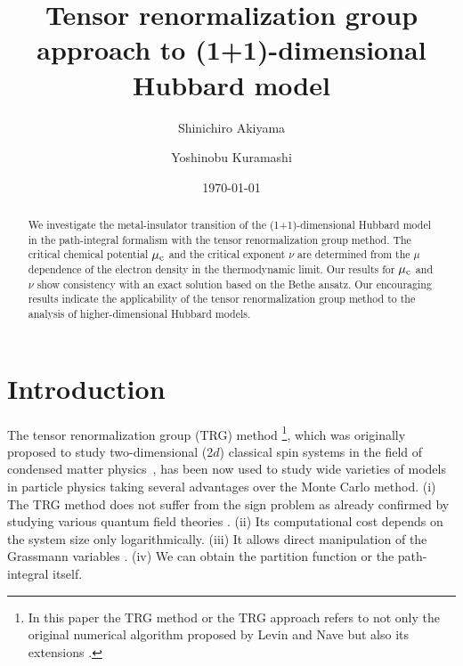 \documentclass[nofootinbib,prd,aps,superscriptaddress,preprintnumbers,twocolumn,showpacs]{revtex4-1}
\begin{document}
\title{Tensor renormalization group approach to (1+1)-dimensional Hubbard model}

  \author{Shinichiro Akiyama}

  \author{Yoshinobu Kuramashi}
    
\begin{abstract}
We investigate the metal-insulator transition of the (1+1)-dimensional Hubbard model in the path-integral formalism with the tensor renormalization group method. The critical chemical potential $\mu_{\rm c}$ and the critical exponent $\nu$ are determined from the $\mu$ dependence of the electron density in the thermodynamic limit. Our results for $\mu_{\rm c}$ and $\nu$ show consistency with an exact solution based on the Bethe ansatz. Our encouraging results indicate the applicability of the tensor renormalization group method to the analysis of higher-dimensional Hubbard models.
\end{abstract}
\date{\today}


\maketitle

\section{Introduction}
\label{sec:intro}

The tensor renormalization group (TRG) method \footnote{In this paper the TRG method or the TRG approach refers to not only the original numerical algorithm proposed by Levin and Nave \cite{Levin:2006jai} but also its extensions \cite{PhysRevB.86.045139,Shimizu:2014uva,Sakai:2017jwp,Adachi:2019paf,Kadoh:2019kqk,Akiyama:2020soe}.}, which was originally proposed to study two-dimensional (2$d$) classical spin systems in the field of condensed matter physics~\cite{Levin:2006jai}, has been now used to study wide varieties of models in particle physics taking several advantages over the Monte Carlo method. (i) The TRG method does not suffer from the sign problem as already confirmed by studying various quantum field theories \cite{Shimizu:2014uva,Shimizu:2014fsa,Shimizu:2017onf,Takeda:2014vwa,Kadoh:2018hqq,Kadoh:2019ube,Kuramashi:2019cgs,Akiyama:2020ntf,Akiyama:2020soe}. (ii) Its computational cost depends on the system size only logarithmically. (iii) It allows direct manipulation of the Grassmann variables \cite{Shimizu:2014uva,Sakai:2017jwp,Yoshimura:2017jpk,Akiyama:2020soe}. (iv) We can obtain the partition function or the path-integral itself.
\end{document}
